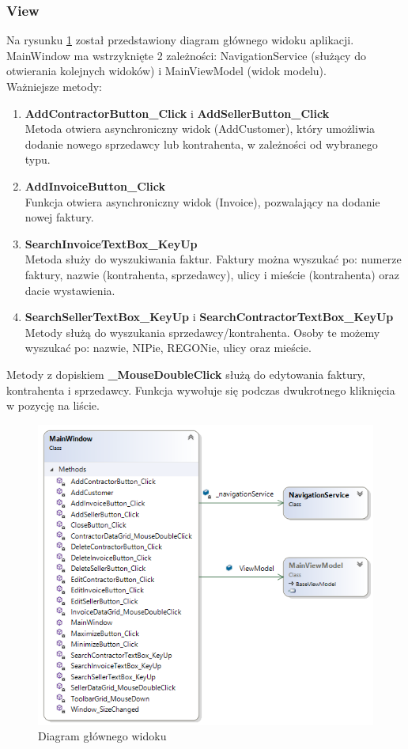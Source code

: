 \subsubsection{View}
Na rysunku \ref{fig:MainWindowDiagram} został przedstawiony diagram głównego widoku aplikacji. MainWindow ma wstrzyknięte 2 zależności: NavigationService (służący do otwierania kolejnych widoków) i MainViewModel (widok modelu). 
\\
Ważniejsze metody:
\begin{enumerate}
    \item \textbf{AddContractorButton\_Click} i \textbf{AddSellerButton\_Click} \\
    Metoda otwiera asynchroniczny widok (AddCustomer), który umożliwia dodanie nowego sprzedawcy lub kontrahenta, w zależności od wybranego typu.
    \item \textbf{AddInvoiceButton\_Click} \\
    Funkcja otwiera asynchroniczny widok (Invoice), pozwalający na dodanie nowej faktury.
    \item \textbf{SearchInvoiceTextBox\_KeyUp} \\
    Metoda służy do wyszukiwania faktur. Faktury można wyszukać po: numerze faktury, nazwie (kontrahenta, sprzedawcy), ulicy i mieście (kontrahenta) oraz dacie wystawienia.
    \item \textbf{SearchSellerTextBox\_KeyUp} i \textbf{SearchContractorTextBox\_KeyUp} \\
    Metody służą do wyszukania sprzedawcy/kontrahenta. Osoby te możemy wyszukać po: nazwie, NIPie, REGONie, ulicy oraz mieście.
\end{enumerate}

Metody z dopiskiem \textbf{\_MouseDoubleClick} służą do edytowania faktury, kontrahenta i sprzedawcy. Funkcja wywołuje się podczas dwukrotnego kliknięcia w pozycję na liście.

\begin{figure}[ht!]
\centering
  \includegraphics[width=0.7\linewidth]{Rysunki/MainWindowDiagram.png}
  \caption{Diagram głównego widoku}
  \label{fig:MainWindowDiagram}
\end{figure}

